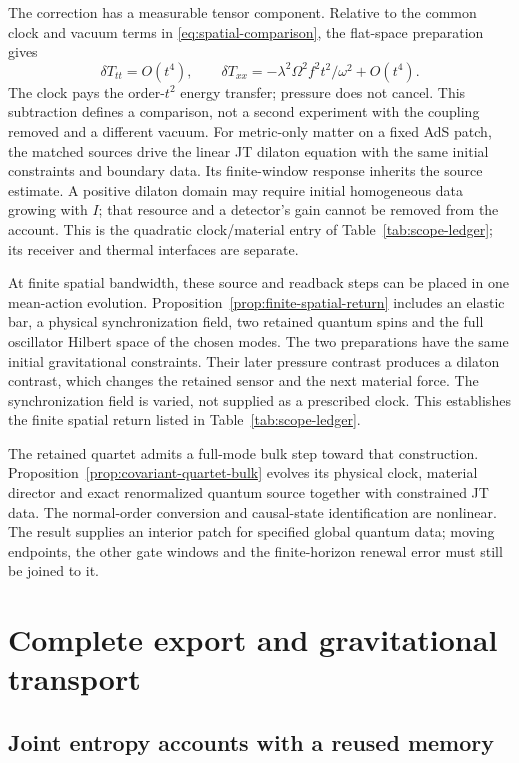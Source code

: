The correction has a measurable tensor component. Relative to the
common clock and vacuum terms in \eqref{eq:spatial-comparison}, the
flat-space preparation gives
\begin{equation}
 \delta T_{tt}=O(t^4),\qquad
 \delta T_{xx}=-\lambda^2\Omega^2 f^2t^2/\omega^2+O(t^4).
\end{equation}
The clock pays the order-$t^2$ energy transfer; pressure does not cancel.
This subtraction defines a comparison, not a second experiment with
the coupling removed and a different vacuum. For metric-only matter
on a fixed AdS patch, the matched sources drive the linear JT dilaton
equation with the same initial constraints and boundary data. Its
finite-window response inherits the source estimate. A positive
dilaton domain may require initial homogeneous data growing with $I$;
that resource and a detector's gain cannot be removed from the account.
This is the quadratic clock/material entry of
Table~\ref{tab:scope-ledger}; its receiver and thermal interfaces are separate.

At finite spatial bandwidth, these source and readback steps can be
placed in one mean-action evolution. Proposition~\ref{prop:finite-spatial-return}
includes an elastic bar, a physical synchronization field, two retained
quantum spins and the full oscillator Hilbert space of the chosen modes.
The two preparations have the same initial gravitational constraints.
Their later pressure contrast produces a dilaton contrast, which changes
the retained sensor and the next material force. The synchronization
field is varied, not supplied as a prescribed clock. This establishes the finite spatial return listed in
Table~\ref{tab:scope-ledger}.

The retained quartet admits a full-mode bulk step toward that construction.
Proposition~\ref{prop:covariant-quartet-bulk} evolves its physical clock,
material director and exact renormalized quantum source together with
constrained JT data. The normal-order conversion and causal-state
identification are nonlinear. The result supplies an interior patch for
specified global quantum data; moving endpoints, the other gate windows
and the finite-horizon renewal error must still be joined to it.


\section{Complete export and gravitational transport}
\label{app:maintenance-details}

\subsection{Joint entropy accounts with a reused memory}

